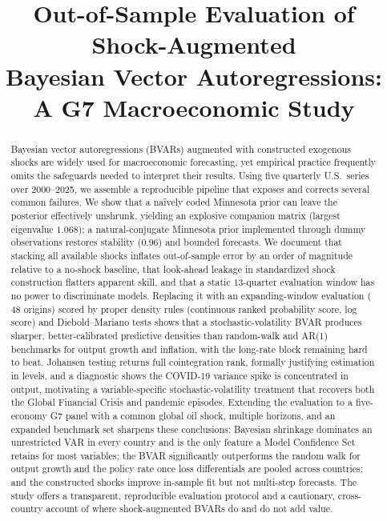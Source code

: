 \documentclass[conference]{IEEEtran}
\begin{document}
\title{Out-of-Sample Evaluation of Shock-Augmented\\ Bayesian Vector Autoregressions:\\ A G7 Macroeconomic Study}

\author{
}

\maketitle

\begin{abstract}
Bayesian vector autoregressions (BVARs) augmented with constructed exogenous
shocks are widely used for macroeconomic forecasting, yet empirical practice
frequently omits the safeguards needed to interpret their results. Using five
quarterly U.S.\ series over 2000--2025, we assemble a reproducible pipeline that
exposes and corrects several common failures. We show that a na\"ively coded
Minnesota prior can leave the posterior effectively unshrunk, yielding an
explosive companion matrix (largest eigenvalue $1.068$); a natural-conjugate
Minnesota prior implemented through dummy observations restores stability
($0.96$) and bounded forecasts. We document that stacking all available shocks
inflates out-of-sample error by an order of magnitude relative to a no-shock
baseline, that look-ahead leakage in standardized shock construction flatters
apparent skill, and that a static $13$-quarter evaluation window has no power to
discriminate models. Replacing it with an expanding-window evaluation
($48$ origins) scored by proper density rules (continuous ranked probability
score, log score) and Diebold--Mariano tests shows that a stochastic-volatility
BVAR produces sharper, better-calibrated predictive densities than random-walk
and AR(1) benchmarks for output growth and inflation, with the long-rate block
remaining hard to beat. Johansen testing returns full cointegration rank,
formally justifying estimation in levels, and a diagnostic shows the COVID-19
variance spike is concentrated in output, motivating a variable-specific
stochastic-volatility treatment that recovers both the Global Financial Crisis
and pandemic episodes. Extending the evaluation to a five-economy G7 panel with a
common global oil shock, multiple horizons, and an expanded benchmark set sharpens
these conclusions: Bayesian shrinkage dominates an unrestricted VAR in every
country and is the only feature a Model Confidence Set retains for most variables;
the BVAR significantly outperforms the random walk for output growth and the
policy rate once loss differentials are pooled across countries; and the
constructed shocks improve in-sample fit but not multi-step forecasts. The study
offers a transparent, reproducible evaluation protocol and a cautionary,
cross-country account of where shock-augmented BVARs do and do not add value.
\end{abstract}
\end{document}
